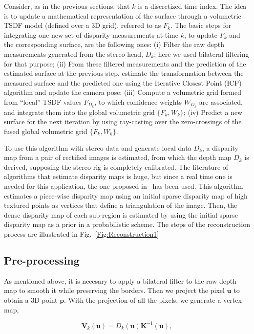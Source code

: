 Consider, as in the previous sections, that $k$ is a discretized time index. The idea is to update a mathematical representation of the surface through a volumetric TSDF model (defined over a 3D grid), referred to as $F_k$. The basic steps for integrating one new set of disparity measurements at time $k$, to update $F_k$ and the corresponding surface, are the following ones: (i) Filter the raw depth measurements generated from the stereo head, $D_k$; here we used bilateral filtering for that purpose; (ii) From these filtered measurements and the prediction of the estimated surface at the previous step, estimate the transformation between the measured surface and the predicted one using the Iterative Closest Point (ICP) algorithm and update the camera pose; (iii) Compute a volumetric grid formed from ``local'' TSDF values $F_{D_k}$, to which confidence weights $W_{D_k}$ are associated, and integrate them into the global volumetric grid $\{F_k,W_k\}$; (iv) Predict a new surface for the next iteration by using ray-casting over the zero-crossings of the fused global volumetric grid $\{F_k,W_k\}$. 

To use this algorithm with stereo data and generate local data $D_k$, a disparity map from a pair of rectified images is estimated, from which the depth map $D_k$ is derived, supposing the stereo rig is completely calibrated. The literature of algorithms that estimate disparity maps is huge, but since a real time one is needed for this application, the one proposed in~\citep{Geiger2010} has been used. This algorithm estimates a piece-wise disparity map using an initial sparse disparity map of high textured points as vertices that define a triangulation of the image. Then, the dense disparity map of each sub-region is estimated by using the initial sparse disparity map as a prior in a probabilistic scheme. The steps of the reconstruction process are illustrated in Fig.~\ref{Fig:Reconstruction1}

\subsection{Pre-processing}
As mentioned above, it is necesary to apply a bilateral filter to the raw depth map to smooth it while preserving the borders.
Then we project the pixel $\mathbf{u}$ to obtain a 3D point $\mathbf{p}$. With the projection of all the pixels, we generate a vertex map,

\begin{equation}
 \mathbf{V}_k(\mathbf{u}) = D_k(\mathbf{u})\mathbf{K}^{-1}(\mathbf{u}),
\end{equation}

